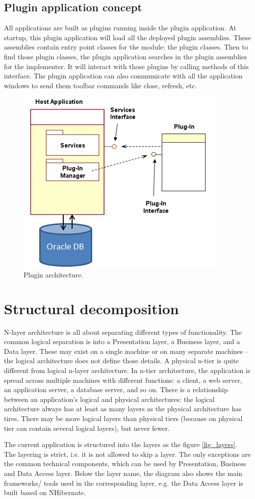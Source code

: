 \subsection{Plugin application concept}
All applications are built as plugins running inside the plugin application. At startup, this plugin application will load all the deployed plugin assemblies. These assemblies contain entry point classes for the module: the plugin classes. Then to find those plugin classes, the plugin application searches in the plugin assemblies for the implementer. It will interact with those plugins by calling methods of this interface. The plugin application can also communicate with all the application windows to send them toolbar commands like close, refresh, etc.
\begin{figure}[ht]\centering
	\includegraphics[width=.7\textwidth]{pic_plug_arch.png}
	\caption{Plugin architecture.}
\end{figure}
%

\section{Structural decomposition}
N-layer architecture is all about separating different types of functionality. The common logical separation is into a Presentation layer, a Business layer, and a Data layer. These may exist on a single machine or on many separate machines – the logical architecture does not define those details. A physical n-tier is quite different from logical n-layer architecture. In n-tier architecture, the application is spread across multiple machines with different functions: a client, a web server, an application server, a database server, and so on. There is a relationship between an application's logical and physical architectures: the logical architecture always has at least as many layers as the physical architecture has tires. There may be more logical layers than physical tiers (because on physical tier can contain several logical layers), but never fewer.
\par
The current application is structured into the layers as the figure \ref{fig_layers}. The layering is strict, i.e. it is not allowed to skip a layer. The only exceptions are the common technical components, which can be used by Presentation, Business and Data Access layer. Below the layer name, the diagram also shows the main frameworks/ tools used in the corresponding layer, e.g. the Data Access layer is built based on NHibernate.

